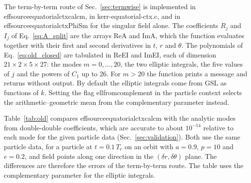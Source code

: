 \documentclass[11pt]{article}
\newcommand{\codeus}{\textunderscore\allowbreak}
\newcommand{\codehy}{-\allowbreak}
\newcommand{\code}[1]{{\ttfamily\let\_\codeus\let\-\codehy #1}}
\begin{document}
The term-by-term route of Sec.~\ref{sec:termwise} is implemented in
\code{effsource\_equatorial\_ctx\_calc\_m}, in \code{kerr\-equatorial\-ctx.c},
and in \code{effsource\_equatorial\_ctx\_PhiS\_m} for the singular field
alone. The coefficients $R_j$ and $I_j$ of Eq.~\eqref{eq:A_split} are the
arrays \code{ReA} and \code{ImA}, which the function evaluates together with
their first and second derivatives in $t$, $r$ and $\theta$. The polynomials of
Eq.~\eqref{eq:old_closed} are tabulated in \code{ReEI} and \code{ImEI}, each of
dimension $21\times2\times5\times27$: the modes $m=0,\dots,20$, the two
elliptic integrals, the five values of $j$ and the powers of $C_1$ up to 26.
For $m>20$ the function prints a message and returns without output. By
default the elliptic integrals come from GSL as functions of $k$. Setting the
flag \code{ell\_from\_complement} in the particle context selects the
arithmetic--geometric mean from the complementary parameter instead.

Table~\ref{tab:old} compares \code{effsource\_equatorial\_ctx\_calc\_m} with
the analytic modes from double-double coefficients, which are accurate to
about $10^{-14}$ relative to each mode for the given particle data
(Sec.~\ref{sec:validation}). Both use the same particle data, for a
particle at $t=0.1\,T_r$ on an orbit with $a=0.9$, $p=10$ and $e=0.2$, and
field points along one direction in the $(\delta r,\delta\theta)$ plane. The
differences are therefore the errors of the term-by-term route. The table uses
the complementary parameter for the elliptic integrals.
\end{document}
